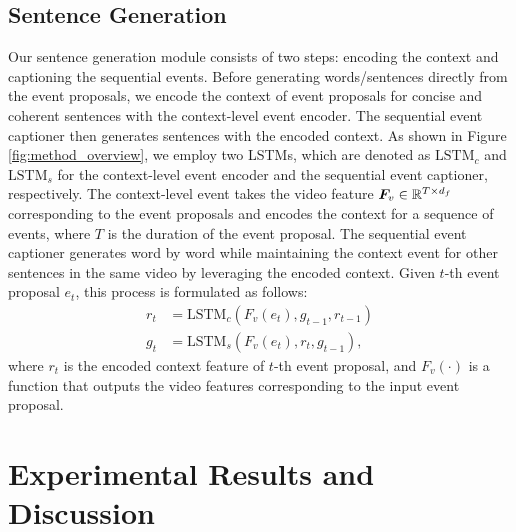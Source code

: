 \subsection{Sentence Generation}
Our sentence generation module consists of two steps: encoding the context and captioning the sequential events.
Before generating words/sentences directly from the event proposals, we encode the context of event proposals for concise and coherent sentences with the context-level event encoder.
The sequential event captioner then generates sentences with the encoded context.
As shown in Figure \ref{fig:method_overview}, we employ two LSTMs, which are denoted as $\text{LSTM}_c$ and $\text{LSTM}_s$ for the context-level event encoder and the sequential event captioner, respectively.
The context-level event takes the video feature $\bm{F}_v \in \mathbb{R}^{T \times d_f}$ corresponding to the event proposals and encodes the context for a sequence of events, where $T$ is the duration of the event proposal.
The sequential event captioner generates word by word while maintaining the context event for other sentences in the same video by leveraging the encoded context.
Given $t$-th event proposal $e_t$, this process is formulated as follows:
\begin{align}
  r_t & = \text{LSTM}_c(F_v(e_t), g_{t-1}, r_{t-1}) \\
  g_t & = \text{LSTM}_s(F_v(e_t), r_t, g_{t-1}),
\end{align}
where $r_t$ is the encoded context feature of $t$-th event proposal, and $F_v(\cdot)$ is a function that outputs the video features corresponding to the input event proposal.

\section{Experimental Results and Discussion}

